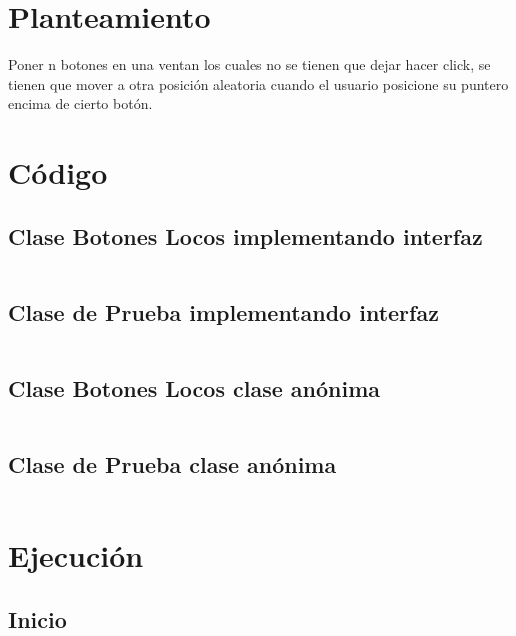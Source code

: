 \documentclass[12pt]{article}
\author{Pablo Vargas Bermúdez}
\begin{document}
\pagestyle{empty}

\section*{Planteamiento}

Poner n botones en una ventan los cuales no se tienen que dejar hacer
click, se tienen que mover a otra posición aleatoria cuando el usuario
posicione su puntero encima de cierto botón.

\section*{Código}

\subsection*{Clase Botones Locos implementando interfaz}
\inputminted{Java}{CrazyButtons.java}

\subsection*{Clase de Prueba implementando interfaz}
\inputminted{Java}{Prueba.java}

\subsection*{Clase Botones Locos clase anónima}
\inputminted{Java}{CrazyButtonsAnonima.java}

\subsection*{Clase de Prueba clase anónima}
\inputminted{Java}{PruebaAnonima.java}

\section*{Ejecución}

\subsection*{Inicio}
\end{document}
